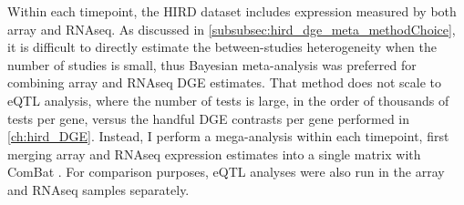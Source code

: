 %
%
%
%
Within each timepoint, the \gls{HIRD} dataset includes expression measured by both array and \gls{RNAseq}.
As discussed in \cref{subsubsec:hird_dge_meta_methodChoice}, it is difficult to directly estimate the between-studies heterogeneity when the number of studies is small, 
thus Bayesian meta-analysis was preferred for combining array and \gls{RNAseq} \gls{DGE} estimates.
That method does not scale to \gls{eQTL} analysis, where the number of tests is large, in the order of thousands of tests per gene, versus the handful \gls{DGE} contrasts per gene performed in \cref{ch:hird_DGE}.
Instead, I perform a mega-analysis within each timepoint, first merging array and \gls{RNAseq} expression estimates into a single matrix with ComBat \autocite{johnson2007AdjustingBatchEffects}.
For comparison purposes, \gls{eQTL} analyses were also run in the array and \gls{RNAseq} samples separately.

